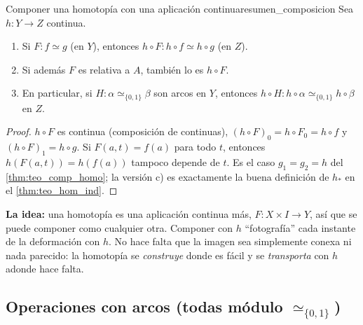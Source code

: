 \begin{proposicion}{Componer una homotopía con una aplicación continua}{resumen_composicion}
Sea $h \colon Y \to Z$ continua.
\begin{enumerate}
    \item[a)] Si $F \colon f \simeq g$ (en $Y$), entonces $h \circ F \colon h \circ f \simeq h \circ g$ (en $Z$).
    \item[b)] Si además $F$ es relativa a $A$, también lo es $h \circ F$.
    \item[c)] En particular, si $H \colon \alpha \simeq_{\{0,1\}} \beta$ son arcos en $Y$, entonces $h \circ H \colon h \circ \alpha \simeq_{\{0,1\}} h \circ \beta$ en $Z$.
\end{enumerate}
\end{proposicion}

\begin{proof}
$h \circ F$ es continua (composición de continuas), $(h \circ F)_0 = h \circ F_0 = h \circ f$ y $(h \circ F)_1 = h \circ g$. Si $F(a,t) = f(a)$ para todo $t$, entonces $h(F(a,t)) = h(f(a))$ tampoco depende de $t$. Es el caso $g_1 = g_2 = h$ del \cref{thm:teo_comp_homo}; la versión c) es exactamente la buena definición de $h_*$ en el \cref{thm:teo_hom_ind}.
\end{proof}

\textbf{La idea:} una homotopía es una aplicación continua más, $F \colon X \times I \to Y$, así que se puede componer como cualquier otra. Componer con $h$ ``fotografía'' cada instante de la deformación con $h$. No hace falta que la imagen sea simplemente conexa ni nada parecido: la homotopía se \emph{construye} donde es fácil y se \emph{transporta} con $h$ adonde hace falta.

\subsection{Operaciones con arcos (todas módulo $\simeq_{\{0,1\}}$)}

